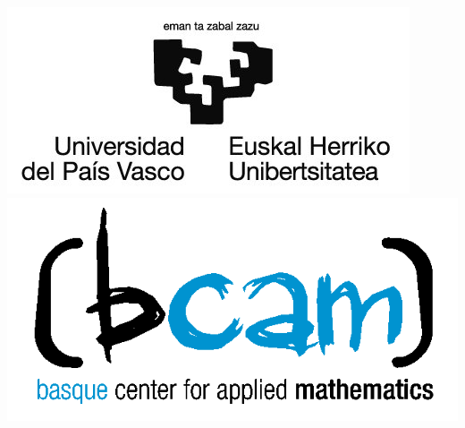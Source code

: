 {

\begin{frame}[plain]
\vspace{1cm}
\titlepage

\vspace{-0.2cm}
\includegraphics[height=0.2\textheight]{frames/auxiliar/title_img/upv_transparente.png} \hspace*{7.2cm}
\includegraphics[height=0.2\textheight]{frames/auxiliar/title_img/bcam_transparente.png} \hspace*{0.2cm}
\end{frame} 

}